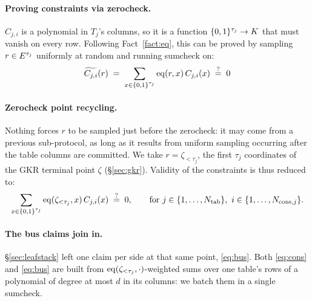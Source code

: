 \paragraph{Proving constraints via zerocheck.} $C_{j,i}$ is a polynomial in $T_j$'s columns, so it is a function $\{0,1\}^{\tau_j}\to K$ that must vanish on every row. Following Fact~\ref{fact:eq}, this can be proved by sampling $r\in E^{\tau_j}$ uniformly at random and running sumcheck on:
\[
  \widetilde{C_{j,i}}(r)\;=\;\sum_{x\in\{0,1\}^{\tau_j}}\operatorname{eq}(r,x)\,C_{j,i}(x)\;\stackrel{?}{=}\;0
\]

\paragraph{Zerocheck point recycling.} Nothing forces $r$ to be sampled just before the zerocheck: it may come from a previous sub-protocol, as long as it results from uniform sampling occurring after the table columns are committed. We take $r=\zeta_{<\tau_j}$, the first $\tau_j$ coordinates of the GKR terminal point $\zeta$ (\S\ref{sec:gkr}). Validity of the constraints is thus reduced to:
\begin{equation}\label{eq:cons}
  \sum_{x\in\cube{\tau_j}}\eq(\zeta_{<\tau_j},x)\,C_{j,i}(x)\;\qeq\;0,
  \qquad \text{for } j\in\{1,\dots,\ntab\},\ i\in\{1,\dots,\ncons{j}\}.
\end{equation}

\paragraph{The bus claims join in.} \S\ref{sec:leafstack} left one claim per side at that same point, \eqref{eq:bus}. Both \eqref{eq:cons} and \eqref{eq:bus} are built from $\operatorname{eq}(\zeta_{<\tau_j},\cdot)$-weighted sums over one table's rows of a polynomial of degree at most $d$ in its columns: we batch them in a single sumcheck.

